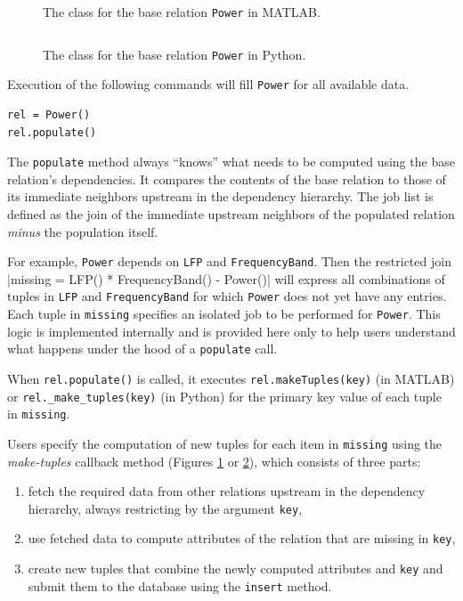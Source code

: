 \documentclass[10pt,letterpaper]{article}
\newcommand{\matlab}[1]{\texttt{#1}}
\begin{document}
\begin{figure}
\inputminted[frame=single,linenos=true]{matlab}{Power.m}
\caption{The class for the base relation \matlab{Power} in MATLAB.}
\label{power-m}
\end{figure}

\begin{figure}
\inputminted[frame=single,linenos=true]{python}{power.py}
\caption{The class for the base relation \matlab{Power} in Python.}
\label{power-py}
\end{figure}

Execution of the following commands will fill \matlab{Power} for all available data.
\begin{verbatim}
rel = Power()
rel.populate()
\end{verbatim}

The \matlab{populate} method always ``knows'' what needs to be computed using the base relation's dependencies.
It compares the contents of the base relation to those of its immediate neighbors upstream in the dependency hierarchy. 
The job list is defined as the join of the immediate upstream neighbors of the populated relation \emph{minus} the population itself.

For example, \matlab{Power} depends on \matlab{LFP} and \matlab{FrequencyBand}. 
Then the restricted join 
|missing = LFP() * FrequencyBand() - Power()|
will express  all combinations of tuples in \matlab{LFP} and \matlab{FrequencyBand} for which \matlab{Power} does not yet have any entries.
Each tuple in \matlab{missing} specifies an isolated job to be performed for \matlab{Power}.
This logic is implemented internally and is provided here only to help users understand what happens under the hood of a \matlab{populate} call.

When \matlab{rel.populate()} is called, it executes  \matlab{rel.makeTuples(key)} (in MATLAB) or \matlab{rel._make_tuples(key)} (in Python) for the primary key value  of each tuple in \matlab{missing}.

Users specify the computation of new tuples for each item in \matlab{missing} using the \emph{make-tuples} callback method (Figures \ref{power-m} or \ref{power-py}),
which consists of three parts: 
\begin{enumerate}
\item fetch the required data from other relations upstream in the dependency hierarchy, always restricting by the argument \matlab{key},
\item use fetched data to compute attributes of the relation that are missing in \matlab{key},
\item create new tuples that combine the newly computed attributes and \matlab{key} and submit them to the database using the \matlab{insert} method.
\end{enumerate}
\end{document}
